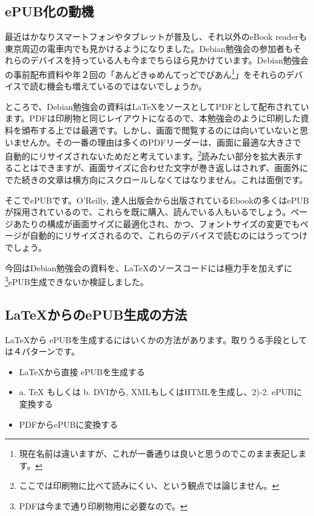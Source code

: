 \documentclass[mingoth,a4paper]{jsarticle}
\begin{document}
\subsection{ePUB化の動機}

最近はかなりスマートフォンやタブレットが普及し、それ以外のeBook readerも東京周辺の電車内でも見かけるようになりました。Debian勉強会の参加者もそれらのデバイスを持っている人も今までちらほら見かけています。Debian勉強会の事前配布資料や年２回の「あんどきゅめんてっどでびあん\footnote{現在名前は違いますが、これが一番通りは良いと思うのでこのまま表記します。}」をそれらのデバイスで読む機会も増えているのではないでしょうか。

ところで、Debian勉強会の資料はLaTeXをソースとしてPDFとして配布されています。PDFは印刷物と同じレイアウトになるので、本勉強会のように印刷した資料を頒布する上では最適です。しかし、画面で閲覧するのには向いていないと思いませんか。その一番の理由は多くのPDFリーダーは、画面に最適な大きさで自動的にリサイズされないためだと考えています。\footnote{ここでは印刷物に比べて読みにくい、という観点では論じません。}読みたい部分を拡大表示することはできますが、画面サイズに合わせた文字が巻き返しはされず、画面外にでた続きの文章は横方向にスクロールしなくてはなりません。これは面倒です。

そこでePUBです。O'Reilly, 達人出版会から出版されているEbookの多くはePUBが採用されているので、これらを既に購入、読んでいる人もいるでしょう。ページあたりの構成が画面サイズに最適化され、かつ、フォントサイズの変更でもページが自動的にリサイズされるので、これらのデバイスで読むのにはうってつけでしょう。

今回はDebian勉強会の資料を、LaTeXのソースコードには極力手を加えずに\footnote{PDFは今まで通り印刷物用に必要なので。}ePUB生成できないか検証しました。

\subsection{LaTeXからのePUB生成の方法}

\LaTeX から ePUBを生成するにはいくかの方法があります。取りうる手段としては４パターンです。

\begin{itemize}
  \item[1)] \LaTeX から直接 ePUBを生成する
  \item[2)] a. TeX もしくは b. DVIから, XMLもしくはHTMLを生成し、2)-2. ePUBに変換する
  \item[3)] PDFからePUBに変換する
\end{itemize}
\end{document}
